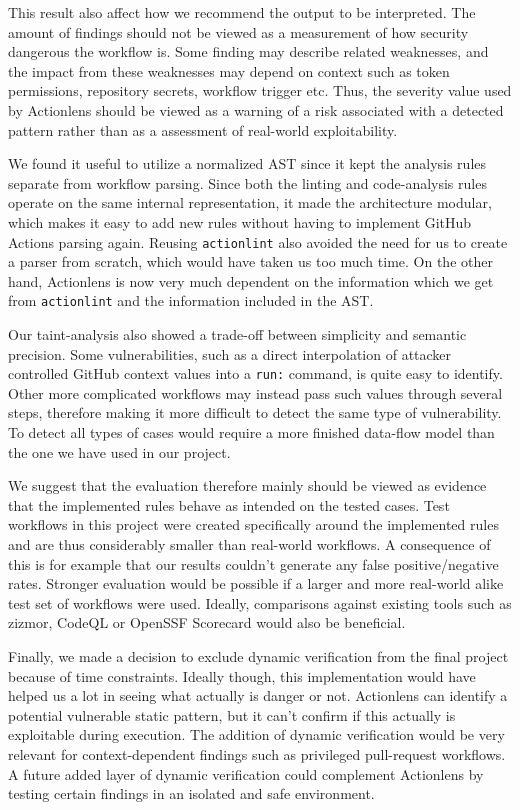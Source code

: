 \documentclass{article}
\begin{document}
This result also affect how we recommend the output to be interpreted. The amount of findings should not be viewed as a measurement of how security dangerous the workflow is. Some finding may describe related weaknesses, and the impact from these weaknesses may depend on context such as token permissions, repository secrets, workflow trigger etc. Thus, the severity value used by Actionlens should be viewed as a warning of a risk associated with a detected pattern rather than as a assessment of real-world exploitability. 

We found it useful to utilize a normalized AST since it kept the analysis rules separate from workflow parsing. Since both the linting and code-analysis rules operate on the same internal representation, it made the architecture modular, which makes it easy to add new rules without having to implement GitHub Actions parsing again. Reusing \texttt{actionlint} also avoided the need for us to create a parser from scratch, which would have taken us too much time. On the other hand, Actionlens is now very much dependent on the information which we get from \texttt{actionlint} and the information included in the AST. 

Our taint-analysis also showed a trade-off between simplicity and semantic precision. Some vulnerabilities, such as a direct interpolation of attacker controlled GitHub context values into a \texttt{run:} command, is quite easy to identify. Other more complicated workflows may instead pass such values through several steps, therefore making it more difficult to detect the same type of vulnerability. To detect all types of cases would require a more finished data-flow model than the one we have used in our project.

We suggest that the evaluation therefore mainly should be viewed as evidence that the implemented rules behave as intended on the tested cases. Test workflows in this project were created specifically around the implemented rules and are thus considerably smaller than real-world workflows. A consequence of this is for example that our results couldn't generate any false positive/negative rates. Stronger evaluation would be possible if a larger and more real-world alike test set of workflows were used. Ideally, comparisons against existing tools such as zizmor, CodeQL or OpenSSF Scorecard would also be beneficial. 

Finally, we made a decision to exclude dynamic verification from the final project because of time constraints. Ideally though, this implementation would have helped us a lot in seeing what actually is danger or not. Actionlens can identify a potential vulnerable static pattern, but it can't confirm if this actually is exploitable during execution. The addition of dynamic verification would be very relevant for context-dependent findings such as privileged pull-request workflows. A future added layer of dynamic verification could complement Actionlens by testing certain findings in an isolated and safe environment. 
\end{document}
